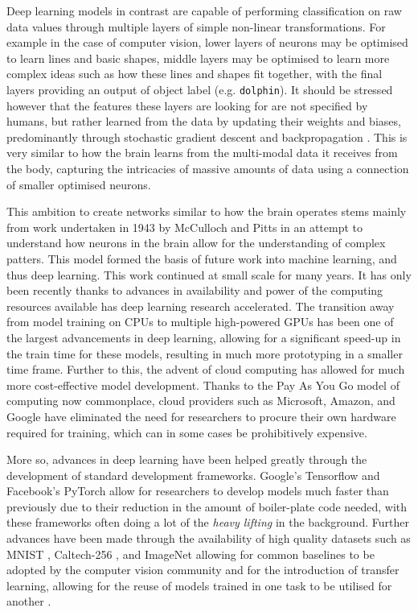 Deep learning models in contrast are capable of performing classification on raw data values through multiple layers of simple non-linear transformations. For example in the case of computer vision, lower layers of neurons may be optimised to learn lines and basic shapes, middle layers may be optimised to learn more complex ideas such as how these lines and shapes fit together, with the final layers providing an output of object label (e.g. \texttt{dolphin}). It should be stressed however that the features these layers are looking for are not specified by humans, but rather learned from the data by updating their weights and biases, predominantly through stochastic gradient descent and backpropagation  \cite{hecht-nielsen_iii.3_1992}. This is very similar to how the brain learns from the multi-modal data it receives from the body, capturing the intricacies of massive amounts of data using a connection of smaller optimised neurons. 

This ambition to create networks similar to how the brain operates stems mainly from work undertaken in 1943 by McCulloch and Pitts \cite{mcculloch_logical_1943} in an attempt to understand how neurons in the brain allow for the understanding of complex patters. This model formed the basis of future work into machine learning, and thus deep learning. This work continued at small scale for many years. It has only been recently thanks to advances in availability and power of the computing resources available has deep learning research accelerated. The transition away from model training on CPUs to multiple high-powered GPUs has been one of the largest advancements in deep learning, allowing for a significant speed-up in the train time for these models, resulting in much more prototyping in a smaller time frame. Further to this, the advent of cloud computing has allowed for much more cost-effective model development. Thanks to the Pay As You Go model of computing now commonplace, cloud providers such as Microsoft, Amazon, and Google have eliminated the need for researchers to procure their own hardware required for training, which can in some cases be prohibitively expensive. 

More so, advances in deep learning have been helped greatly through the development of standard development frameworks. Google's Tensorflow \cite{abadi_tensorflow:_2016} and Facebook's PyTorch \cite{paszke_automatic_2017} allow for researchers to develop models much faster than previously due to their reduction in the amount of boiler-plate code needed, with these frameworks often doing a lot of the \textit{heavy lifting} in the background. Further advances have been made through the availability of high quality datasets such as MNIST \cite{lecun_gradient-based_1998}, Caltech-256 \cite{griffin_caltech-256_2007}, and ImageNet \cite{deng_imagenet:_2009} allowing for common baselines to be adopted by the computer vision community and for the introduction of transfer learning, allowing for the reuse of models trained in one task to be utilised for another \cite{pan_survey_2010}.

